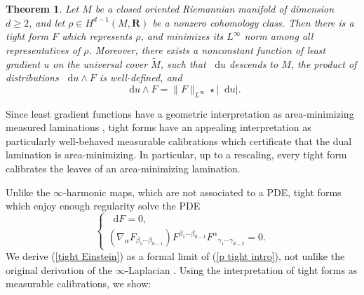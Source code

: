 \documentclass[reqno,11pt]{amsart}
\newcommand{\RR}{\mathbf{R}}
\newcommand*\dif{\mathop{}\!\mathrm{d}}
\newtheorem{mainthm}{Theorem}
\theoremstyle{definition}
\numberwithin{equation}{section}
\begin{document}
\begin{mainthm}\label{existence of infinity tight forms}
Let $M$ be a closed oriented Riemannian manifold of dimension $d \geq 2$, and let $\rho \in H^{d - 1}(M, \RR)$ be a nonzero cohomology class.
Then there is a tight form $F$ which represents $\rho$, and minimizes its $L^\infty$ norm among all representatives of $\rho$.
Moreover, there exists a nonconstant function of least gradient $u$ on the universal cover $\tilde M$, such that $\dif u$ descends to $M$, the product of distributions $\dif u \wedge F$ is well-defined, and
\begin{equation}\label{max flow min cut}
\dif u \wedge F = \|F\|_{L^\infty} \star |\dif u|.
\end{equation}
\end{mainthm}

Since least gradient functions have a geometric interpretation as area-minimizing measured laminations \cite{BackusCML}, tight forms have an appealing interpretation as particularly well-behaved measurable calibrations which certificate that the dual lamination is area-minimizing.
In particular, up to a rescaling, every tight form calibrates the leaves of an area-minimizing lamination.




Unlike the $\infty$-harmonic maps, which are not associated to a PDE, tight forms which enjoy enough regularity solve the PDE
\begin{equation}\label{tight Einstein}
\begin{cases}\dif F = 0, \\
	(\nabla_\alpha F_{\beta_1 \cdots \beta_{d - 1}}) F^{\beta_1 \cdots \beta_{d - 1}} {F^\alpha}_{\gamma_1 \cdots \gamma_{d - 2}} = 0.
\end{cases}
\end{equation}
We derive (\ref{tight Einstein}) as a formal limit of (\ref{p tight intro}), not unlike the original derivation of the $\infty$-Laplacian \cite{Aronsson67}.
Using the interpretation of tight forms as measurable calibrations, we show:
\end{document}
